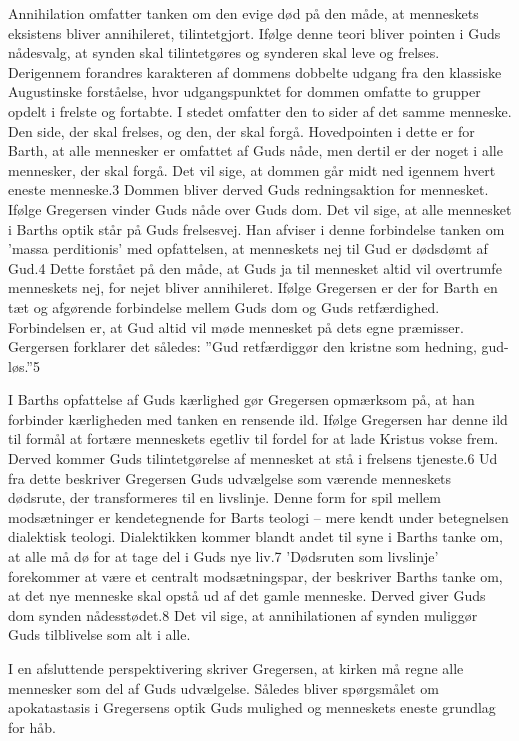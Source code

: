 Annihilation omfatter tanken om den evige død på den måde, at menneskets eksistens bliver annihileret, tilintetgjort. Ifølge denne teori bliver pointen i Guds nådesvalg, at synden skal tilintetgøres og synderen skal leve og frelses. Derigennem forandres karakteren af dommens dobbelte udgang fra den klassiske Augustinske forståelse, hvor udgangspunktet for dommen omfatte to grupper opdelt i frelste og fortabte. I stedet omfatter den to sider af det samme menneske. Den side, der skal frelses, og den, der skal forgå. Hovedpointen i dette er for Barth, at alle mennesker er omfattet af Guds nåde, men dertil er der noget i alle mennesker, der skal forgå. Det vil sige, at dommen går midt ned igennem hvert eneste menneske.3 Dommen bliver derved Guds redningsaktion for mennesket. Ifølge Gregersen vinder Guds nåde over Guds dom. Det vil sige, at alle mennesket i Barths optik står på Guds frelsesvej. Han afviser i denne forbindelse tanken om 'massa perditionis' med opfattelsen, at menneskets nej til Gud er dødsdømt af Gud.4 Dette forstået på den måde, at Guds ja til mennesket altid vil overtrumfe menneskets nej, for nejet bliver annihileret. Ifølge Gregersen er der for Barth en tæt og afgørende forbindelse mellem Guds dom og Guds retfærdighed. Forbindelsen er, at Gud altid vil møde mennesket på dets egne præmisser. Gergersen forklarer det således: ”Gud retfærdiggør den kristne som hedning, gud-løs.”5 

I Barths opfattelse af Guds kærlighed gør Gregersen opmærksom på, at han forbinder kærligheden med tanken en rensende ild. Ifølge Gregersen har denne ild til formål at fortære menneskets egetliv til fordel for at lade Kristus vokse frem. Derved kommer Guds tilintetgørelse af mennesket at stå i frelsens tjeneste.6 Ud fra dette beskriver Gregersen Guds udvælgelse som værende menneskets dødsrute, der transformeres til en livslinje. Denne form for spil mellem modsætninger er kendetegnende for Barts teologi -- mere kendt under betegnelsen dialektisk teologi. Dialektikken kommer blandt andet til syne i Barths tanke om, at alle må dø for at tage del i Guds nye liv.7 'Dødsruten som livslinje' forekommer at være et centralt modsætningspar, der beskriver Barths tanke om, at det nye menneske skal opstå ud af det gamle menneske. Derved giver Guds dom synden nådesstødet.8 Det vil sige, at annihilationen af synden muliggør Guds tilblivelse som alt i alle. 

I en afsluttende perspektivering skriver Gregersen, at kirken må regne alle mennesker som del af Guds udvælgelse. Således bliver spørgsmålet om apokatastasis i Gregersens optik Guds mulighed og menneskets eneste grundlag for håb. 